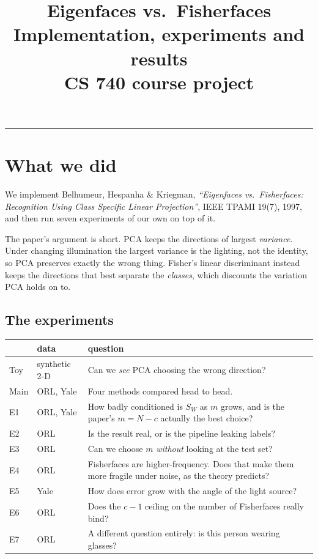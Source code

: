 \documentclass[11pt]{article}
\title{\vspace{-1.3cm}\textbf{Eigenfaces vs.\ Fisherfaces}\\[3pt]
\large Implementation, experiments and results\\[2pt]
\normalsize CS 740 course project}
\date{}
\theoremstyle{remark}
\newcommand{\Sw}{S_W}
\begin{document}
\maketitle
\vspace{-1.1cm}

{\small
\setlength{\parskip}{0pt}
\tableofcontents
}

\vspace{4pt}\hrule\vspace{10pt}

\section{What we did}

We implement Belhumeur, Hespanha \& Kriegman, \emph{``Eigenfaces vs.\
Fisherfaces: Recognition Using Class Specific Linear Projection''}, IEEE TPAMI
19(7), 1997, and then run seven experiments of our own on top of it.

The paper's argument is short. PCA keeps the directions of largest
\emph{variance}. Under changing illumination the largest variance is the
lighting, not the identity, so PCA preserves exactly the wrong thing. Fisher's
linear discriminant instead keeps the directions that best separate the
\emph{classes}, which discounts the variation PCA holds on to.

\subsection{The experiments}

\begin{center}
\small
\begin{tabular}{llp{7.0cm}}
\toprule
 & data & question \\
\midrule
Toy  & synthetic 2-D & Can we \emph{see} PCA choosing the wrong direction? \\
Main & ORL, Yale     & Four methods compared head to head. \\
\midrule
E1 & ORL, Yale & How badly conditioned is $\Sw$ as $m$ grows, and is the
                  paper's $m=N-c$ actually the best choice? \\
E2 & ORL       & Is the result real, or is the pipeline leaking labels? \\
E3 & ORL       & Can we choose $m$ \emph{without} looking at the test set? \\
E4 & ORL       & Fisherfaces are higher-frequency. Does that make them more
                  fragile under noise, as the theory predicts? \\
E5 & Yale      & How does error grow with the angle of the light source? \\
E6 & ORL       & Does the $c-1$ ceiling on the number of Fisherfaces really
                  bind? \\
E7 & ORL       & A different question entirely: is this person wearing
                  glasses? \\
\bottomrule
\end{tabular}
\end{center}
\end{document}
